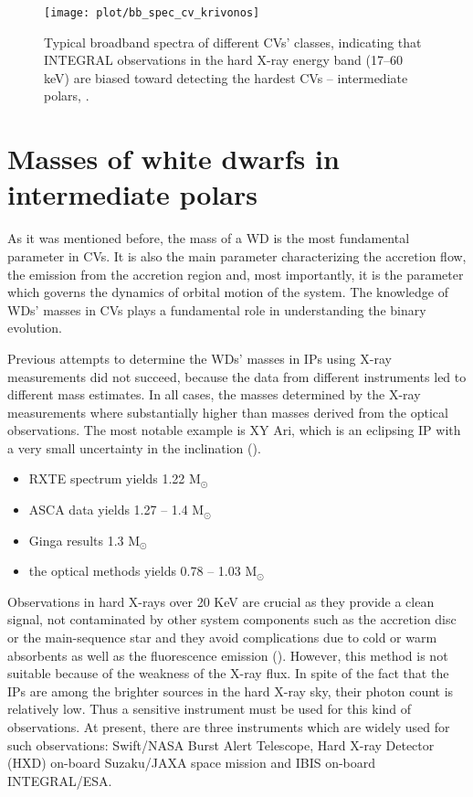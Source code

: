 \documentclass[oneside,a4paper,11pt]{report}
\begin{document}
\begin{figure}[hbt]
\centering
\texttt{[image: plot/bb\_spec\_cv\_krivonos]}
\caption{Typical broadband spectra of different CVs' classes, indicating that INTEGRAL observations in 
the hard X-ray energy band (17--60 keV) are biased toward detecting the hardest CVs -- intermediate polars, 
\citet{2008A&A...489.1121R}.}
\label{kriv_1} 
\end{figure}


\chapter{Masses of white dwarfs in intermediate polars}
As it was mentioned before, the mass of a WD is the most fundamental parameter in CVs. It is also the 
main parameter characterizing the accretion flow, the emission from the accretion region and, most 
importantly, it is the parameter which governs the dynamics of orbital motion of the system. The 
knowledge of WDs' masses in CVs plays a fundamental role in understanding the binary evolution. 

Previous attempts to determine the WDs' masses in IPs using X-ray measurements did not succeed, 
because the data from different instruments led to different mass estimates. In all cases, the 
masses  determined by the X-ray measurements where substantially higher than masses derived from  the optical 
observations. The most notable example is XY Ari, which is an eclipsing IP with a very small uncertainty in 
the inclination (\citet{1998MNRAS.297.1269R}).          
\begin{itemize}
 \item RXTE spectrum yields 1.22 M$_\odot$
 \item ASCA data yields 1.27 -- 1.4 M$_\odot$
 \item Ginga results 1.3 M$_\odot$
 \item the optical methods yields 0.78 -- 1.03 M$_\odot$ 
\end{itemize}
Observations in hard X-rays over 20 KeV are crucial as they provide a clean signal, not contaminated 
by other system components such as the accretion disc or the main-sequence star and they avoid 
complications due to cold or warm absorbents as well as the fluorescence emission (\citet{2009A&A...496..121B}). 
However, this method is not suitable because of the weakness of the X-ray flux. In spite of the fact that the IPs 
are among the brighter sources in the hard X-ray sky, their photon count is relatively low. Thus a sensitive 
instrument must be used for this kind of observations. At present, there are three instruments which are 
widely used for such observations: Swift/NASA Burst Alert Telescope, Hard X-ray Detector
(HXD) on-board Suzaku/JAXA space mission and IBIS on-board INTEGRAL/ESA.
\end{document}
